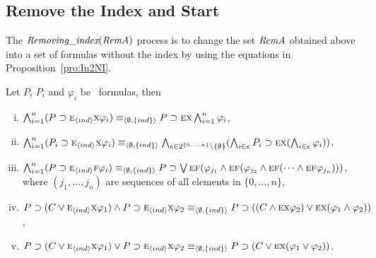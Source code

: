 \documentclass{article}
\begin{document}
\subsection{Remove the Index and Start}
The $\emph{Removing\_index}(\emph{RemA})$ process is to change the set $\emph{RemA}$ obtained above into a set of formulas without the index by using the equations in Proposition~\ref{pro:In2NI}.
\begin{proposition}\label{pro:In2NI}
Let $P$, $P_i$ and $\varphi_i$ be \CTL\ formulas, then
\begin{enumerate}[(i)]
  \item $\bigwedge_{i=1}^n (P\supset \textsc{e}_{{\langle{ind}\rangle}} \textsc{x} \varphi_i)  \equiv_{{\langle{\emptyset, \{ind\}}\rangle}} P\supset \textsc{e} \textsc{x} \bigwedge_{i=1}^n \varphi_i$,
  \item $\bigwedge_{i=1}^n (P_i\supset \textsc{e}_{{\langle{ind}\rangle}} \textsc{x} \varphi_i) \equiv_{{\langle{\emptyset, \{ind\}}\rangle}} \bigwedge_{e \in 2^{\{0,\dots, n\}} \setminus \{\emptyset\}}(\bigwedge_{i\in e}P_i\supset \textsc{e} \textsc{x} (\bigwedge_{i\in e}\varphi_i))$,
  \item $\bigwedge_{i=1}^n (P\supset \textsc{e}_{{\langle{ind}\rangle}} \textsc{f} \varphi_i)  \equiv_{{\langle{\emptyset, \{ind\}}\rangle}} P\supset \bigvee\textsc{e}\textsc{f} (\varphi_{j_1} \wedge \textsc{e}\textsc{f}(\varphi_{j_2} \wedge \textsc{e}\textsc{f}(\dots \wedge \textsc{e}\textsc{f} \varphi_{j_n})))$, where $(j_1, \dots, j_n)$ are sequences of all elements in $\{0, \dots, n\}$,
  \item $P\supset (C \vee \textsc{e}_{{\langle{ind}\rangle}} \textsc{x} \varphi_1) \wedge P \supset \textsc{e}_{{\langle{ind}\rangle}} \textsc{x} \varphi_2 \equiv_{{\langle{\emptyset, \{ind\}}\rangle}} P \supset ((C \wedge \textsc{e} \textsc{x} \varphi_2) \vee \textsc{e} \textsc{x} (\varphi_1 \wedge \varphi_2))$,
  \item $P\supset (C \vee \textsc{e}_{{\langle{ind}\rangle}} \textsc{x} \varphi_1) \vee P \supset \textsc{e}_{{\langle{ind}\rangle}} \textsc{x} \varphi_2 \equiv_{{\langle{\emptyset, \{ind\}}\rangle}} P \supset (C \vee \textsc{e} \textsc{x} (\varphi_1 \vee \varphi_2))$.
\end{enumerate}
\end{proposition}
\end{document}
